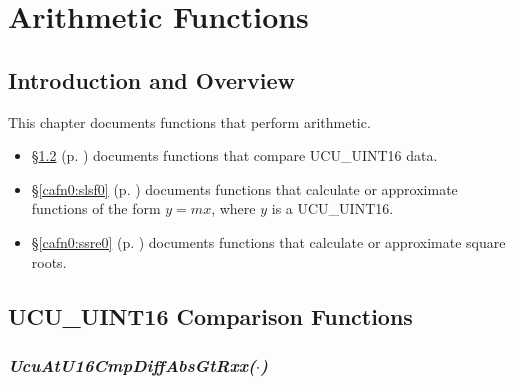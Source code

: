 
\chapter{Arithmetic Functions}

\label{cafn0}

\section{Introduction and Overview}
\label{cafn0:siov0}

This chapter documents functions that perform arithmetic.

\begin{itemize}
\item \S{}\ref{cafn0:sscx0} (p. \pageref{cafn0:sscx0}) documents
      functions that compare UCU\_UINT16 data.
\item \S{}\ref{cafn0:slsf0} (p. \pageref{cafn0:slsf0}) documents
      functions that calculate or approximate functions of the form
      $y=mx$, where $y$ is a UCU\_UINT16.
\item \S{}\ref{cafn0:ssre0} (p. \pageref{cafn0:ssre0}) documents
      functions that calculate or approximate square roots.
\end{itemize}


\section{UCU\_UINT16 Comparison Functions}
\label{cafn0:sscx0}

\subsection[\emph{UcuAtU16CmpDiffAbsGtRxx(\protect\mbox{\protect$\cdot$})}]
           {\emph{UcuAtU16CmpDiffAbsGtRxx(\protect\mbox{\protect\boldmath $\cdot$})}}
\label{cafn0:sscx0:scsx0}

